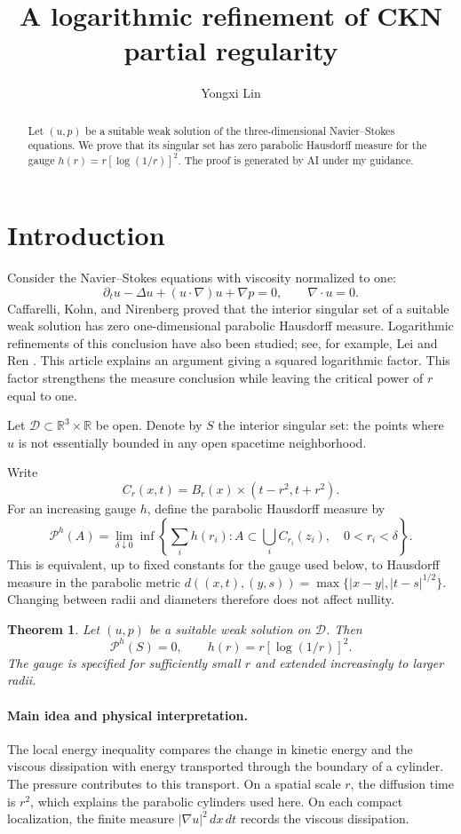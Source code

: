 \documentclass[11pt]{article}
\title{A logarithmic refinement of CKN partial regularity}
\author{Yongxi Lin}
\date{}
\newtheorem{theorem}{Theorem}
\newcommand{\R}{\mathbb R}
\begin{document}
\maketitle

\begin{abstract}
Let \((u,p)\) be a suitable weak solution of the three-dimensional
Navier--Stokes equations.
We prove that its singular set has zero parabolic Hausdorff
measure for the gauge
$h(r)=r[\log(1/r)]^2.$
The proof is generated by AI under my guidance.
\end{abstract}

\section{Introduction}

Consider the Navier--Stokes equations with viscosity normalized to one:
$$
\partial_tu-\Delta u+(u\cdot\nabla)u+\nabla p=0,
\qquad \nabla\cdot u=0.
$$
Caffarelli, Kohn, and Nirenberg \cite{CKN} proved that the interior
singular set of a suitable weak solution has zero one-dimensional
parabolic Hausdorff measure. Logarithmic refinements of this conclusion
have also been studied; see, for example, Lei and Ren \cite{LR}.
This article explains an argument giving a squared logarithmic
factor. This factor strengthens the measure conclusion while leaving
the critical power of \(r\) equal to one.

Let \(\mathcal D\subset\R^3\times\R\) be open. Denote by \(S\) the
interior singular set: the points where \(u\) is not essentially bounded
in any open spacetime neighborhood.

Write
$$
C_r(x,t)=B_r(x)\times(t-r^2,t+r^2).
$$
For an increasing gauge \(h\), define the parabolic Hausdorff measure by
$$
\mathcal P^h(A)=\lim_{\delta\downarrow0}
\inf\left\{\sum_i h(r_i):
 A\subset\bigcup_i C_{r_i}(z_i),\quad 0<r_i<\delta\right\}.
$$
This is equivalent, up to fixed constants for the gauge used below,
to Hausdorff measure in the parabolic metric
\(d((x,t),(y,s))=\max\{|x-y|,|t-s|^{1/2}\}\).
Changing between radii and diameters therefore does not affect nullity.

\begin{theorem}\label{main}
Let \((u,p)\) be a suitable weak solution on \(\mathcal D\). Then
$$
\mathcal P^h(S)=0,
\qquad h(r)=r[\log(1/r)]^2.
$$
The gauge is specified for sufficiently small \(r\) and extended
increasingly to larger radii.
\end{theorem}

\paragraph{Main idea and physical interpretation.}
The local energy inequality compares the change in kinetic energy and
the viscous dissipation with energy transported through the boundary
of a cylinder. The pressure contributes to this transport. On a spatial
scale \(r\), the diffusion time is \(r^2\), which explains the parabolic
cylinders used here. On each compact localization, the finite measure
\(|\nabla u|^2\,dx\,dt\) records the viscous dissipation.
\end{document}
